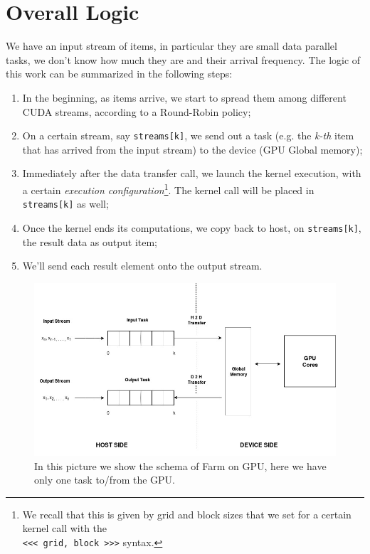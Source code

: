 \section{Overall Logic}
\label{sect:overallLogic}
We have an input stream of items, in particular they are small data parallel tasks, we don't know how much they are and their arrival frequency.
The logic of this work can be summarized in the following steps:
\begin{enumerate}
	\item In the beginning, as items arrive, we start to spread them among different CUDA streams, according to a Round-Robin policy;
	\item On a certain stream, say \texttt{streams[k]}, we send out a task (e.g. the \textit{k-th} item that has arrived from the input stream) to the device (GPU Global memory);
	\item Immediately after the data transfer call, we launch the kernel execution, with a certain \textit{execution configuration}\footnote{We recall that this is given by grid and block sizes that we set for a certain kernel call with the\\ \texttt{<<< grid, block >>>} syntax.}. The kernel call will be placed in \texttt{streams[k]} as well;
	\item Once the kernel ends its computations, we copy back to host, on \texttt{streams[k]}, the result data as output item;
	\item We'll send each result element onto the output stream. 
\end{enumerate}

	\begin{figure}
		\includegraphics[width=\linewidth]{images/singleLogic.jpg}
		\caption{In this picture we show the schema of Farm on GPU, here we have only one task to/from the GPU.}
		\label{fig:H2D}
	\end{figure}
	
